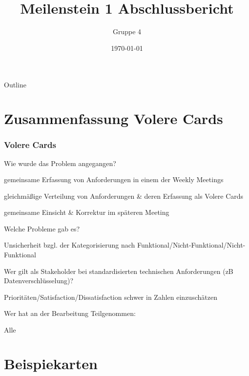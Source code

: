 \documentclass{beamer}
\title{Meilenstein 1 Abschlussbericht}
\author{Gruppe 4}
\date{\today}
\institute{TU Chemnitz}
\begin{document}
\begin{titlepage}


\end{titlepage}

\begin{frame}{Outline}
    \tableofcontents
\end{frame}

\section{Zusammenfassung Volere Cards}
\begin{frame}
    \frametitle{Volere Cards}
    Wie wurde das Problem angegangen?
    \begin{description}[font=$\bullet$]
        \item gemeinsame Erfassung von Anforderungen in einem der Weekly Meetings
        \item gleichmäßige Verteilung von Anforderungen \& deren Erfassung als Volere Cards
        \item gemeinsame Einsicht \& Korrektur im späteren Meeting
    \end{description}

\end{frame}
\begin{frame}
    Welche Probleme gab es?

    \begin{description}[font=$\bullet$]
        \item Unsicherheit bzgl. der Kategorisierung nach Funktional/Nicht-Funktional/Nicht-Funktional
        \item Wer gilt als Stakeholder bei standardisierten technischen Anforderungen (zB Datenverschlüsselung)?
        \item Prioritäten/Satisfaction/Dissatisfaction schwer in Zahlen einzuschätzen
    \end{description}

    Wer hat an der Bearbeitung Teilgenommen:
    \begin{description}[font=$\bullet$]
        \item Alle
    \end{description}
\end{frame}
\section{Beispiekarten}

\begingroup
\fontsize{8px}{12pt}\selectfont
\begin{frame}
    
\end{frame}
\begin{frame}
    
\end{frame}
\begin{frame}
    
\end{frame}
\begin{frame}
    
\end{frame}
\begin{frame}
    
\end{frame}
\endgroup
\end{document}
